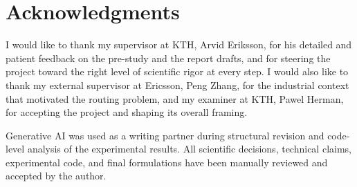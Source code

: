 \documentclass[english, bibtex]{kththesis}               %
\newcommand*{\engExpl}[1]{\todo[inline, backgroundcolor=kth-lightgreen40]{#1}} %
\renewcommand\engExpl[1]{}
\numberwithin{listing}{chapter}
\begin{document}
\section*{Acknowledgments}

I would like to thank my supervisor at KTH, Arvid Eriksson, for his detailed and patient feedback on the pre-study and the report drafts, and for steering the project toward the right level of scientific rigor at every step. I would also like to thank my external supervisor at Ericsson, Peng Zhang, for the industrial context that motivated the routing problem, and my examiner at KTH, Pawel Herman, for accepting the project and shaping its overall framing.

Generative AI was used as a writing partner during structural revision and code-level analysis of the experimental results. All scientific decisions, technical claims, experimental code, and final formulations have been manually reviewed and accepted by the author.

\acknowlegmentssignature

\renewcommand{\chaptermark}[1]{ \markboth{#1}{}} 
\tableofcontents
  \markboth{\contentsname}{}

\cleardoublepage
\listoffigures

\cleardoublepage

\listoftables
\cleardoublepage
\lstlistoflistings\engExpl{If you have listings in your thesis. If not, then remove this preface page.}
\cleardoublepage
\printglossary[style=mylong, type=\acronymtype, title={List of acronyms and abbreviations}]

\engExpl{The list of acronyms and abbreviations should be in alphabetical order based on the spelling of the acronym or abbreviation.
}

\ifnomenclature
    \cleardoublepage
    \printnomenclature
\fi
\end{document}

